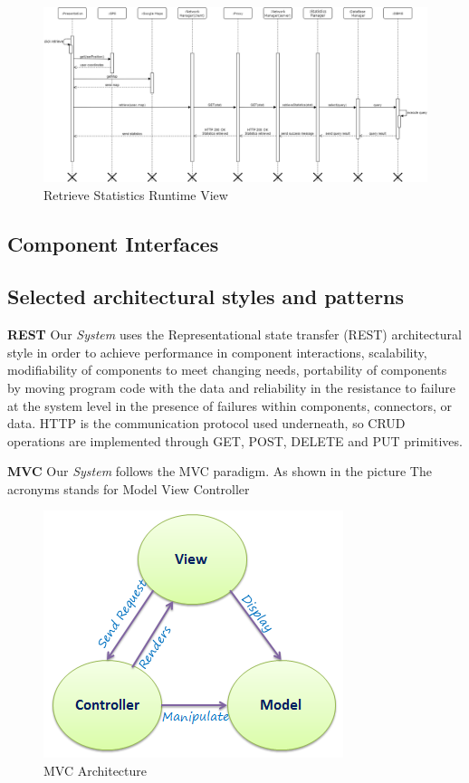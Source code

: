 \documentclass{article}
\begin{document}
\begin{figure}[H]
    \centering
    \includegraphics[scale=0.4]{img/sequence_diagrams/retrieve_statistics.png}
    \caption{Retrieve Statistics Runtime View}
\end{figure}  

\subsection{Component Interfaces}
\subsection{Selected architectural styles and patterns}

\textbf{REST}
Our \textit{System} uses the Representational state transfer (REST) architectural style in order to achieve 
performance in component interactions, scalability, modifiability of components to meet changing needs, portability 
of components by moving program code with the data and reliability in the resistance to failure at the system level
in the presence of failures within components, connectors, or data. HTTP is the communication protocol used underneath, 
so CRUD operations are implemented through GET, POST, DELETE and PUT primitives.


\textbf{MVC}
Our \textit{System} follows the MVC paradigm. As shown in the picture The acronyms stands for Model View Controller

\begin{figure}[H]
    \centering
    \includegraphics[scale=0.5]{img/mvc-architecture.png}
    \caption{MVC Architecture}
\end{figure}
\end{document}

